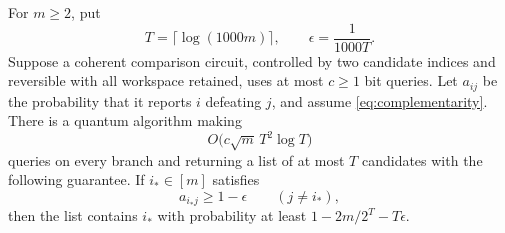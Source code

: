\begin{proposition}
\label{prop:tournament}
For $m\ge2$, put
\[
 T=\lceil\log(1000m)\rceil,
 \qquad \epsilon=\frac{1}{1000T}.
\]
Suppose a coherent comparison circuit, controlled by two candidate
indices and reversible with all workspace retained, uses at most
$c\ge1$ bit queries. Let $a_{ij}$ be the probability that it reports
$i$ defeating $j$, and assume \eqref{eq:complementarity}. There is
a quantum algorithm making
\[
 O\bigl(c\sqrt m\,T^2\log T\bigr)
\]
queries on every branch and returning a list of at most $T$ candidates
with the following guarantee. If $i_\ast\in[m]$ satisfies
\begin{equation}\label{eq:dominant}
 a_{i_\ast j}\ge1-\epsilon\qquad(j\ne i_\ast),
\end{equation}
then the list contains $i_\ast$ with probability at least
$1-2m/2^T-T\epsilon$.
\end{proposition}

